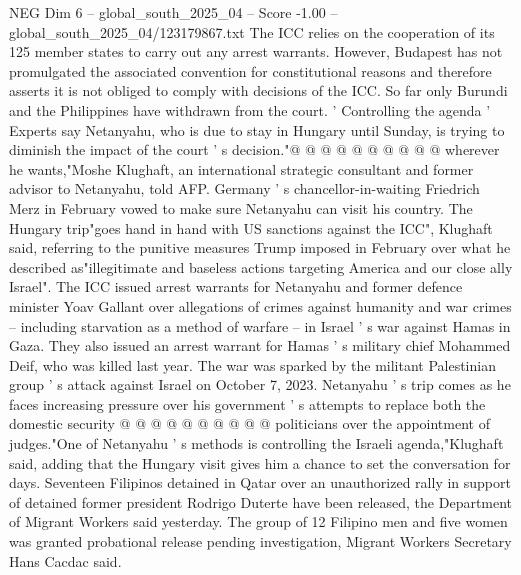 \begin{textsample}{NEG Dim 6 – global\_south\_2025\_04 – Score -1.00 – global\_south\_2025\_04/123179867.txt}
The ICC relies on the cooperation of its 125 member states to carry out any arrest warrants.
However, Budapest has not promulgated the associated convention for constitutional reasons and therefore asserts it is not obliged to comply with decisions of the ICC.
So far only Burundi and the Philippines have withdrawn from the court. ' Controlling the agenda ' Experts say Netanyahu, who is due to stay in Hungary until Sunday, is trying to diminish the impact of the court ' s decision."@ @ @ @ @ @ @ @ @ @ wherever he wants,"Moshe Klughaft, an international strategic consultant and former advisor to Netanyahu, told AFP.
Germany ' s chancellor-in-waiting Friedrich Merz in February vowed to make sure Netanyahu can visit his country.
The Hungary trip"goes hand in hand with US sanctions against the ICC", Klughaft said, referring to the punitive measures Trump imposed in February over what he described as"illegitimate and baseless actions targeting America and our close ally Israel".
The ICC issued arrest warrants for Netanyahu and former defence minister Yoav Gallant over allegations of crimes against humanity and war crimes -- including starvation as a method of warfare -- in Israel ' s war against Hamas in Gaza.
They also issued an arrest warrant for Hamas ' s military chief Mohammed Deif, who was killed last year.
The war was sparked by the militant Palestinian group ' s attack against Israel on October 7, 2023.
Netanyahu ' s trip comes as he faces increasing pressure over his government ' s attempts to replace both the domestic security @ @ @ @ @ @ @ @ @ @ politicians over the appointment of judges."One of Netanyahu ' s methods is controlling the Israeli agenda,"Klughaft said, adding that the Hungary visit gives him a chance to set the conversation for days.
Seventeen Filipinos detained in Qatar over an unauthorized rally in support of detained former president Rodrigo Duterte have been released, the Department of Migrant Workers said yesterday.
The group of 12 Filipino men and five women was granted probational release pending investigation, Migrant Workers Secretary Hans Cacdac said.

\end{textsample}
